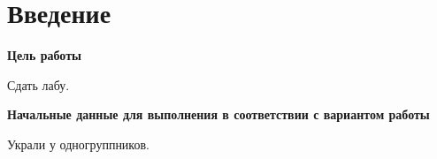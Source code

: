 \section{Введение}

\textbf{Цель работы}

Сдать лабу.

\textbf{Начальные данные для выполнения в соответствии с вариантом работы}

Украли у одногруппников. 